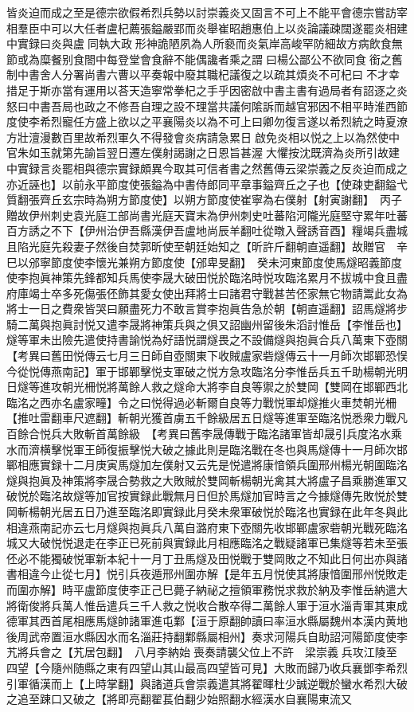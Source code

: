 皆炎迫而成之至是德宗欲假希烈兵勢以討崇義炎又固言不可上不能平會德宗嘗訪宰相羣臣中可以大任者盧杞薦張鎰嚴郢而炎舉崔昭趙惠伯上以炎論議疎闊遂罷炎相建中實録曰炎與盧同執大政形神詭陋夙為人所褻而炎氣岸高峻罕防細故方病飲食無節或為糜餐别食閤中每登堂會食辭不能偶讒者乘之謂曰楊公鄙公不欲同食銜之舊制中書舍人分署尚書六曹以平奏報中廢其職杞議復之以疏其煩炎不可杞曰不才幸措足于斯亦當有運用以荅天造寧常拳杞之手乎因密啟中書主書有過局者有詔逐之炎怒曰中書吾局也政之不修吾自理之設不理當共議何隂訴而越官邪因不相平時淮西節度使李希烈寵任方盛上欲以之平襄陽炎以為不可上曰卿勿復言遂以希烈統之時夏潦方壯澶漫數百里故希烈軍久不得發會炎病請急累日啟免炎相以悦之上以為然使中官朱如玉就第先諭旨翌日遷左僕射謁謝之日恩旨甚渥大懼按沈既濟為炎所引故建中實録言炎罷相與德宗實録頗異今取其可信者書之然舊傳云梁崇義之反炎迫而成之亦近誣也】以前永平節度使張鎰為中書侍郎同平章事鎰齊丘之子也【使疎吏翻鎰弋質翻張齊丘玄宗時為朔方節度使】以朔方節度使崔寧為右僕射【射寅謝翻】　丙子贈故伊州刺史袁光庭工部尚書光庭天寶末為伊州刺史吐蕃陷河隴光庭堅守累年吐蕃百方誘之不下【伊州治伊吾縣漢伊吾盧地尚辰羊翻吐從暾入聲誘音酉】糧竭兵盡城且陷光庭先殺妻子然後自焚郭昕使至朝廷始知之【昕許斤翻朝直遥翻】故贈官　辛巳以邠寧節度使李懷光兼朔方節度使【邠卑旻翻】　癸未河東節度使馬燧昭義節度使李抱眞神策先鋒都知兵馬使李晟大破田悦於臨洺時悦攻臨洺累月不拔城中食且盡府庫竭士卒多死傷張伾飾其愛女使出拜將士曰諸君守戰甚苦伾家無它物請鬻此女為將士一日之費衆皆哭曰願盡死力不敢言賞李抱眞告急於朝【朝直遥翻】詔馬燧將步騎二萬與抱眞討悦又遣李晟將神策兵與之俱又詔幽州留後朱滔討惟岳【李惟岳也】燧等軍未出險先遣使持書諭悦為好語悦謂燧畏之不設備燧與抱眞合兵八萬東下壺關　【考異曰舊田悦傳云七月三日師自壺關東下收賊盧家砦燧傳云十一月師次邯鄲恐悮今從悦傳燕南記】軍于邯鄲擊悦支軍破之悦方急攻臨洺分李惟岳兵五千助楊朝光明日燧等進攻朝光柵悦將萬餘人救之燧命大將李自良等禦之於雙岡【雙岡在邯鄲西北臨洺之西亦名盧家疃】令之曰悦得過必斬爾自良等力戰悦軍却燧推火車焚朝光柵【推吐雷翻車尺遮翻】斬朝光獲首虜五千餘級居五日燧等進軍至臨洺悦悉衆力戰凡百餘合悦兵大敗斬首萬餘級　【考異曰舊李晟傳戰于臨洺諸軍皆却晟引兵度洺水乘水而濟横擊悦軍王師復振擊悦大破之據此則是臨洺戰在冬也與馬燧傳十一月師次邯鄲相應實録十二月庚寅馬燧加左僕射又云先是悦遣將康愔領兵圍邢州楊光朝圍臨洺燧與抱眞及神策將李晟合勢救之大敗賊於雙岡斬楊朝光禽其大將盧子昌乘勝進軍又破悦於臨洺故燧等加官按實録此戰無月日但於馬燧加官時言之今據燧傳先敗悦於雙岡斬楊朝光居五日乃進至臨洺即實録此月癸未衆軍破悦於臨洺也實録在此年冬與此相違燕南記亦云七月燧與抱眞兵八萬自潞府東下壺關先收邯鄲盧家砦朝光戰死臨洺城又大破悦悦退走在李正已死前與實録此月相應臨洺之戰疑諸軍已集燧等若未至張伾必不能獨破悦軍新本紀十一月丁丑馬燧及田悦戰于雙岡敗之不知此日何出亦與諸書相違今止從七月】悦引兵夜遁邢州圍亦解【是年五月悦使其將康愔圍邢州悦敗走而圍亦解】時平盧節度使李正己巳薨子納祕之擅領軍務悦求救於納及李惟岳納遣大將衛俊將兵萬人惟岳遣兵三千人救之悦收合散卒得二萬餘人軍于洹水淄青軍其東成德軍其西首尾相應馬燧帥諸軍進屯鄴【洹于原翻帥讀曰率洹水縣屬魏州本漢内黄地後周武帝置洹水縣因水而名淄莊持翻鄴縣屬相州】奏求河陽兵自助詔河陽節度使李艽將兵會之【艽居包翻】　八月李納始喪奏請襲父位上不許　梁崇義兵攻江陵至四望【今隨州随縣之東有四望山其山最高四望皆可見】大敗而歸乃收兵襄鄧李希烈引軍循漢而上【上時掌翻】與諸道兵會崇義遣其將翟暉杜少誠逆戰於蠻水希烈大破之追至踈口又破之【將即亮翻翟萇伯翻少始照翻水經漢水自襄陽東流又
